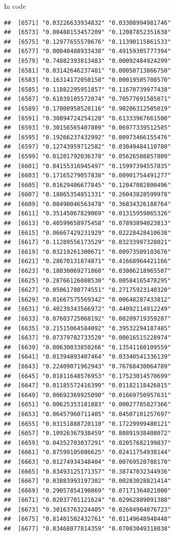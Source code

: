 \documentclass[ignorenonframetext,]{beamer}
\begin{document}
\begin{frame}[fragile]{In code}
\begin{verbatim}
##  [6571] "0.03226633934832" "0.03308994981746"
##  [6573] "0.00488153457209" "0.12087852351638"
##  [6575] "0.12977655570676" "0.11390115861533"
##  [6577] "0.00040408933438" "0.49159305777394"
##  [6579] "0.74882393813483" "0.00092484924299"
##  [6581] "0.03142646237481" "0.00050713866750"
##  [6583] "0.16314172050158" "0.00019505708570"
##  [6585] "0.11882295951857" "0.11670739977438"
##  [6587] "0.61039105572074" "0.70577691505071"
##  [6589] "0.17000958520116" "0.90206312505019"
##  [6591] "0.30894724254120" "0.61333967661500"
##  [6593] "0.30156565407809" "0.06977339512585"
##  [6595] "0.19266237432992" "0.00973466155476"
##  [6597] "0.12743959712582" "0.03049484110780"
##  [6599] "0.01201792036378" "0.05626508857809"
##  [6601] "0.04155316945497" "0.15997394557835"
##  [6603] "0.17165279057838" "0.00901754491277"
##  [6605] "0.01629406677845" "0.12047082800496"
##  [6607] "0.18865354851331" "0.26043828599978"
##  [6609] "0.08490046563478" "0.36834326188764"
##  [6611] "0.35145067829069" "0.01315959065326"
##  [6613] "0.40599658975458" "0.07893894023813"
##  [6615] "0.06667429231929" "0.02228428410638"
##  [6617] "0.11289556173529" "0.03233997328021"
##  [6619] "0.03219261300671" "0.00973509103676"
##  [6621] "0.28670131874871" "0.41668964421166"
##  [6623] "0.18030069271860" "0.03006218965507"
##  [6625] "0.28766126088530" "0.00584165478295"
##  [6627] "0.05061780774551" "0.27175923140320"
##  [6629] "0.01667575569342" "0.00648287433812"
##  [6631] "0.40239343566972" "0.44092114912249"
##  [6633] "0.07603725068192" "0.00209719359207"
##  [6635] "0.21515064584092" "0.39532294187485"
##  [6637] "0.07379782733520" "0.00016515228974"
##  [6639] "0.00630033850266" "0.13541160109559"
##  [6641] "0.01394893407464" "0.03340541336139"
##  [6643] "0.22409071962943" "0.76768430064789"
##  [6645] "0.01811648576953" "0.17523014570699"
##  [6647] "0.01185572416399" "0.01182118426815"
##  [6649] "0.00692369925090" "0.01669750957631"
##  [6651] "0.00625353181883" "0.00027785827366"
##  [6653] "0.06457960711405" "0.04507101257697"
##  [6655] "0.03151888720110" "0.17229999480121"
##  [6657] "0.10926367938459" "0.80891938408072"
##  [6659] "0.04352703037291" "0.02057682199837"
##  [6661] "0.87599105086625" "0.02411754938144"
##  [6663] "0.01274934348404" "0.00769520788170"
##  [6665] "0.83493125171357" "0.38747032344936"
##  [6667] "0.03883993197302" "0.00283028821414"
##  [6669] "0.29057854190869" "0.07171364021000"
##  [6671] "0.02037701121624" "0.02962889091388"
##  [6673] "0.30163763224405" "0.02604904076723"
##  [6675] "0.81401502432761" "0.01149648948448"
##  [6677] "0.03468077814359" "0.07003049318038"

\end{verbatim}
\end{frame}
\end{document}
